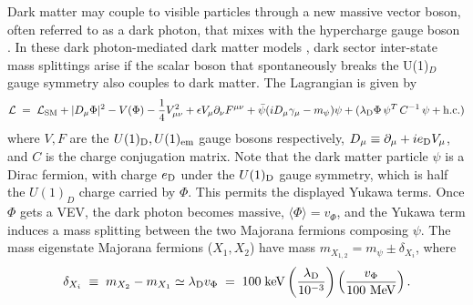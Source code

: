 \documentclass[11pt]{article}
\begin{document}
Dark matter may couple to visible particles through a new massive vector boson, often referred to as a dark photon, that mixes with the hypercharge gauge boson \cite{Holdom:1985ag}. In these dark photon-mediated dark matter models \cite{Pospelov:2007mp,Cheung:2007ut,Feldman:2007wj,ArkaniHamed:2008qn,Finkbeiner:2009mi}, dark sector inter-state mass splittings arise if the scalar boson that spontaneously breaks the U(1)$_{D}$ gauge symmetry also couples to dark matter. The Lagrangian is given by
\begin{equation}
\mathcal{L} \; = \; \mathcal{L}_{\rm SM} + |D_{\mu} \Phi|^2 - V(\Phi) - \frac{1}{4} V_{\mu \nu}^2 + \epsilon V_\mu \partial_\nu F^{\mu \nu} + \bar{\psi} (iD_\mu \gamma_\mu - m_{\psi})\psi +(\lambda_{\rm D} \Phi\, \psi^T\, C^{-1}\, \psi + {\rm h.c.})
\label{eq:dplag}
\end{equation}
where $V,F$ are the $U(1)_{\rm D},U(1)_{\rm em}$ gauge bosons respectively, $D_\mu \equiv \partial_\mu + ie_{\rm D} V_\mu$, and $C$ is the charge conjugation matrix. Note that the dark matter particle $\psi$ is a Dirac fermion, with charge $e_{\rm D}$ under the $U(1)_{\rm D}$ gauge symmetry, which is half the $U(1)_D$ charge carried by $\Phi$. This permits the displayed Yukawa terms. Once $\Phi$ gets a VEV, the dark photon becomes massive, $\langle \Phi \rangle =v_{\Phi}$, and the Yukawa term induces a mass splitting between the two Majorana fermions composing $\psi$. The mass eigenstate Majorana fermions  ($X_1,X_2$) have mass $m_{X_{1,2}} = m_{\psi} \pm \delta_{X_i}$, where  
\begin{equation}
\delta_{X_i} \; \equiv \; m_{X_2}-m_{X_1} \simeq \lambda_{\rm D} v_{\rm \Phi} \; = \; 100 \; {\rm keV} \left( \frac{\lambda_{\rm D}}{10^{-3}} \right) \left( \frac{v_{\Phi}}{100~{\rm MeV}} \right).
\end{equation}
\end{document}
